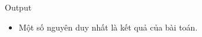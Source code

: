 Output  
\begin{itemize}
	\item     Một số nguyên duy nhất là kết quả của bài toán.   
\end{itemize}